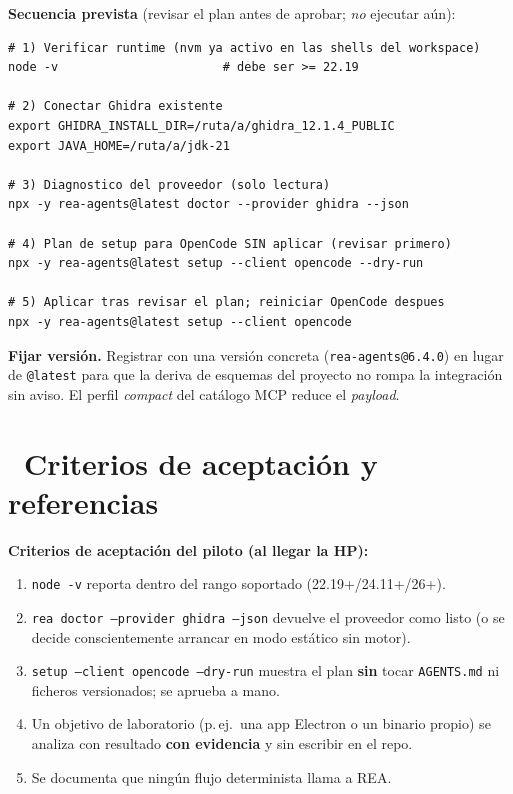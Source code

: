 \documentclass[11pt,a4paper]{article}
\newcommand{\iconotexto}[2]{\textcolor{cyanNeon}{\faIcon{#1}}~#2}
\begin{document}
\begin{cajaEjemplo}
\textbf{Secuencia prevista} (revisar el plan antes de aprobar; \emph{no} ejecutar aún):
\begin{lstlisting}
# 1) Verificar runtime (nvm ya activo en las shells del workspace)
node -v                       # debe ser >= 22.19

# 2) Conectar Ghidra existente
export GHIDRA_INSTALL_DIR=/ruta/a/ghidra_12.1.4_PUBLIC
export JAVA_HOME=/ruta/a/jdk-21

# 3) Diagnostico del proveedor (solo lectura)
npx -y rea-agents@latest doctor --provider ghidra --json

# 4) Plan de setup para OpenCode SIN aplicar (revisar primero)
npx -y rea-agents@latest setup --client opencode --dry-run

# 5) Aplicar tras revisar el plan; reiniciar OpenCode despues
npx -y rea-agents@latest setup --client opencode
\end{lstlisting}
\end{cajaEjemplo}

\begin{cajaRecuerda}
\textbf{Fijar versión.} Registrar con una versión concreta (\texttt{rea-agents@6.4.0}) en
lugar de \texttt{@latest} para que la deriva de esquemas del proyecto no rompa la
integración sin aviso. El perfil \emph{compact} del catálogo MCP reduce el \emph{payload}.
\end{cajaRecuerda}

\section[Criterios de aceptación]{\iconotexto{clipboard-check}{Criterios de aceptación y referencias}}

\textbf{Criterios de aceptación del piloto (al llegar la HP):}
\begin{enumerate}[leftmargin=1.4em]
  \item \texttt{node -v} reporta dentro del rango soportado (22.19+/24.11+/26+).
  \item \texttt{rea doctor --provider ghidra --json} devuelve el proveedor como listo
  (o se decide conscientemente arrancar en modo estático sin motor).
  \item \texttt{setup --client opencode --dry-run} muestra el plan \textbf{sin} tocar
  \texttt{AGENTS.md} ni ficheros versionados; se aprueba a mano.
  \item Un objetivo de laboratorio (p.\,ej.\ una app Electron o un binario propio) se
  analiza con resultado \textbf{con evidencia} y sin escribir en el repo.
  \item Se documenta que ningún flujo determinista llama a REA.
\end{enumerate}
\end{document}

